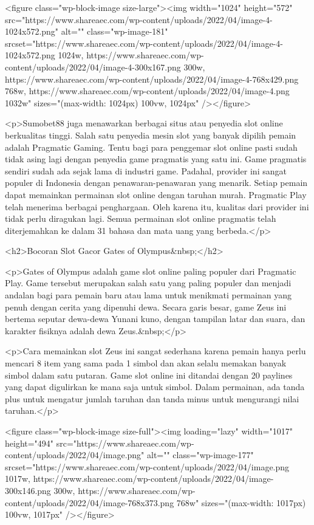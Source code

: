 {<figure class="wp-block-image size-large"><img width="1024" height="572" src="https://www.shareaec.com/wp-content/uploads/2022/04/image-4-1024x572.png" alt="" class="wp-image-181" srcset="https://www.shareaec.com/wp-content/uploads/2022/04/image-4-1024x572.png 1024w, https://www.shareaec.com/wp-content/uploads/2022/04/image-4-300x167.png 300w, https://www.shareaec.com/wp-content/uploads/2022/04/image-4-768x429.png 768w, https://www.shareaec.com/wp-content/uploads/2022/04/image-4.png 1032w" sizes="(max-width: 1024px) 100vw, 1024px" /></figure>



<p>Sumobet88 juga menawarkan berbagai situs atau penyedia slot online berkualitas tinggi. Salah satu penyedia mesin slot yang banyak dipilih pemain adalah Pragmatic Gaming. Tentu bagi para penggemar slot online pasti sudah tidak asing lagi dengan penyedia game pragmatis yang satu ini. Game pragmatis sendiri sudah ada sejak lama di industri game. Padahal, provider ini sangat populer di Indonesia dengan penawaran-penawaran yang menarik. Setiap pemain dapat memainkan permainan slot online dengan taruhan murah. Pragmatic Play telah menerima berbagai penghargaan. Oleh karena itu, kualitas dari provider ini tidak perlu diragukan lagi. Semua permainan slot online pragmatis telah diterjemahkan ke dalam 31 bahasa dan mata uang yang berbeda.</p>



<h2>Bocoran Slot Gacor Gates of Olympus&nbsp;</h2>



<p>Gates of Olympus adalah game slot online paling populer dari Pragmatic Play. Game tersebut merupakan salah satu yang paling populer dan menjadi andalan bagi para pemain baru atau lama untuk menikmati permainan yang penuh dengan cerita yang dipenuhi dewa. Secara garis besar, game Zeus ini bertema seputar dewa-dewa Yunani kuno, dengan tampilan latar dan suara, dan karakter fisiknya adalah dewa Zeus.&nbsp;</p>



<p>Cara memainkan slot Zeus ini sangat sederhana karena pemain hanya perlu mencari 8 item yang sama pada 1 simbol dan akan selalu memakan banyak simbol dalam satu putaran. Game slot online ini ditandai dengan 20 paylines yang dapat digulirkan ke mana saja untuk simbol. Dalam permainan, ada tanda plus untuk mengatur jumlah taruhan dan tanda minus untuk mengurangi nilai taruhan.</p>



<figure class="wp-block-image size-full"><img loading="lazy" width="1017" height="494" src="https://www.shareaec.com/wp-content/uploads/2022/04/image.png" alt="" class="wp-image-177" srcset="https://www.shareaec.com/wp-content/uploads/2022/04/image.png 1017w, https://www.shareaec.com/wp-content/uploads/2022/04/image-300x146.png 300w, https://www.shareaec.com/wp-content/uploads/2022/04/image-768x373.png 768w" sizes="(max-width: 1017px) 100vw, 1017px" /></figure>



}

